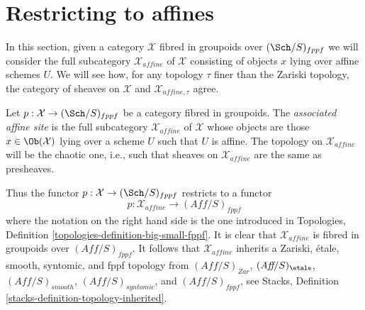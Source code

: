 \section{Restricting to affines}
\label{section-alternative}

\noindent
In this section, given a category $\mathcal{X}$ fibred in groupoids over
$(\Sch/S)_{fppf}$ we will consider the full subcategory $\mathcal{X}_{affine}$
of $\mathcal{X}$ consisting of objects $x$ lying over affine schemes $U$.
We will see how, for any topology $\tau$ finer than the Zariski topology,
the category of sheaves on $\mathcal{X}$ and $\mathcal{X}_{affine, \tau}$
agree.

\begin{definition}
\label{definition-alternative}
Let $p : \mathcal{X} \to (\Sch/S)_{fppf}$ be a category fibred in groupoids.
The {\it associated affine site} is the full subcategory
$\mathcal{X}_{affine}$ of $\mathcal{X}$ whose objects are those
$x \in \Ob(\mathcal{X})$ lying over a scheme $U$ such that $U$
is affine. The topology on $\mathcal{X}_{affine}$ will be the chaotic one,
i.e., such that sheaves on $\mathcal{X}_{affine}$ are the same as presheaves.
\end{definition}

\noindent
Thus the functor $p : \mathcal{X} \to (\Sch/S)_{fppf}$ restricts to a functor
$$
p : \mathcal{X}_{affine} \longrightarrow (\textit{Aff}/S)_{fppf}
$$
where the notation on the right hand side is the one introduced in
Topologies, Definition \ref{topologies-definition-big-small-fppf}.
It is clear that $\mathcal{X}_{affine}$ is fibred in groupoids over
$(\textit{Aff}/S)_{fppf}$. It follows that $\mathcal{X}_{affine}$
inherits a Zariski, \'etale, smooth, syntomic, and fppf topology
from $(\textit{Aff}/S)_{Zar}$, $(\textit{Aff}/S)_\etale$,
$(\textit{Aff}/S)_{smooth}$, $(\textit{Aff}/S)_{syntomic}$, and
$(\textit{Aff}/S)_{fppf}$, see
Stacks, Definition \ref{stacks-definition-topology-inherited}.

